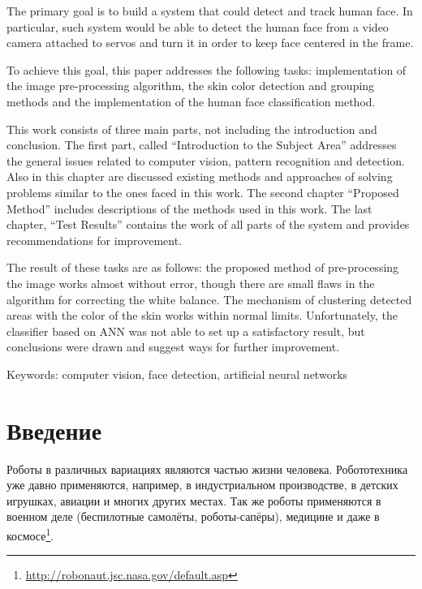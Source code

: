 \documentclass[12pt]{report}
\begin{document}
The primary goal is to build a system that could detect and track human face. In particular, such system would be able to detect the human face from a video camera attached to servos and turn it in order to keep face centered in the frame.

To achieve this goal, this paper addresses the following tasks: implementation of the image pre-processing algorithm, the skin color detection and grouping methods and the implementation of the human face classification method.

This work consists of three main parts, not including the introduction and conclusion. The first
part, called ``Introduction to the Subject Area'' addresses the general issues related to computer
vision, pattern recognition and detection. Also in this chapter are discussed existing methods and approaches of solving problems similar to the ones faced in this work. The second chapter ``Proposed Method'' includes descriptions of the methods used in this work. The last chapter, ``Test Results'' contains the work of all parts of the system and provides recommendations for improvement.

The result of these tasks are as follows: the proposed method of pre-processing the image
works almost without error, though there are small flaws in the algorithm for correcting the
white balance. The mechanism of clustering detected areas with the color of the skin works within normal limits. Unfortunately, the classifier based on ANN was not able to set up a satisfactory result, but conclusions were drawn and suggest ways for further improvement.

Keywords: computer vision, face detection, artificial neural networks


\chapter*{Введение}
\thispagestyle{fancy}

Роботы в различных вариациях являются частью жизни человека. Робототехника уже
давно применяются, например, в индустриальном производстве, в детских игрушках,
авиации и многих других местах. Так же роботы применяются в военном деле (беспилотные
самолёты, роботы-сапёры), медицине и даже в космосе\footnote{\url{http://robonaut.jsc.nasa.gov/default.asp}}.
\end{document}
